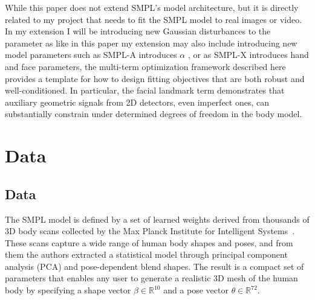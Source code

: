 \documentclass[final]{article}
\begin{document}
While this paper does not extend SMPL's model architecture, but it is directly related to my project that needs to fit the SMPL model to real images or video. In my extension I will be introducing new Gaussian disturbances to the parameter as like in this paper my extension may also include introducing new model parameters such as SMPL-A introduces $\alpha$ \cite{GuoPZKCW22}, or as SMPL-X introduces hand and face parameters, the multi-term optimization framework described here provides a template for how to design fitting objectives that are both robust and well-conditioned. In particular, the facial landmark term demonstrates that auxiliary geometric signals from 2D detectors, even imperfect ones, can substantially constrain under determined degrees of freedom in the body model.


 


\section{Data}

\subsection{Data}

The SMPL model is defined by a set of learned weights derived from thousands of 3D body scans collected by the Max Planck Institute for Intelligent Systems~\cite{SMPL:2015}. These scans capture a wide range of human body shapes and poses, and from them the authors extracted a statistical model through principal component analysis (PCA) and pose-dependent blend shapes. The result is a compact set of parameters that enables any user to generate a realistic 3D mesh of the human body by specifying a shape vector $\beta \in \mathbb{R}^{10}$ and a pose vector $\theta \in \mathbb{R}^{72}$.
\end{document}
